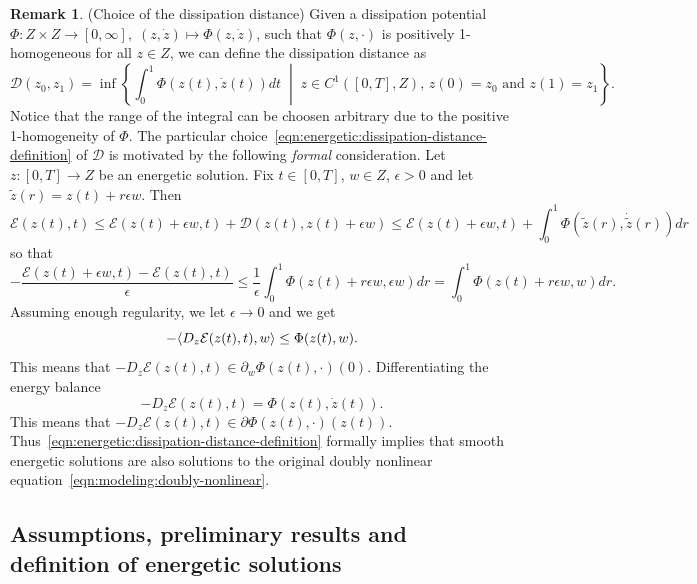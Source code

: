 \documentclass[a4paper,10pt,twoside]{amsbook}
\numberwithin{section}{chapter}
\numberwithin{equation}{chapter}
\theoremstyle{definition}
\newtheorem{rmk}[prop]{Remark}
\DeclarePairedDelimiter{\dual}{\langle}{\rangle}
\begin{document}
\begin{rmk}(Choice of the dissipation distance)
\label{rmk:minimum-dissipation}
Given a dissipation potential $\Phi\colon Z\times Z\to[0,\infty],\;(z,\dot z)\mapsto\Phi(z,\dot z)$, such that $\Phi(z,\cdot)$ is positively 1-homogeneous for all $z\in Z$, we can define the dissipation distance as
\begin{equation}
\label{eqn:energetic:dissipation-distance-definition}
\mathcal{D}(z_0,z_1)=\inf\left\{\int_0^1\Phi(z(t),\dot{z}(t))dt\;\middle|\;\text{$z\in C^1([0,T],Z)$, $z(0)=z_0$ and $z(1)=z_1$}\right\}.
\end{equation}
Notice that the range of the integral can be choosen arbitrary due to the positive 1-homogeneity of $\Phi$. The particular choice~\eqref{eqn:energetic:dissipation-distance-definition} of $\mathcal{D}$ is motivated by the following \emph{formal} consideration. Let $z\colon[0,T]\to Z$ be an energetic solution. Fix $t\in[0,T]$, $w\in Z$, $\epsilon>0$ and let $\tilde z(r)=z(t)+r\epsilon w$. Then
\[
\mathcal{E}(z(t),t)\le\mathcal{E}(z(t)+\epsilon w,t)+\mathcal{D}(z(t),z(t)+\epsilon w)\le\mathcal{E}(z(t)+\epsilon w,t)+\int_0^1\Phi(\tilde z(r),\dot{\tilde z}(r))dr
\]
so that
\[
-\frac{\mathcal{E}(z(t)+\epsilon w,t)-\mathcal{E}(z(t),t)}{\epsilon}\le\frac{1}{\epsilon}\int_0^1\Phi(z(t)+r\epsilon w,\epsilon w)dr=\int_0^1\Phi(z(t)+r\epsilon w,w)dr.
\]
Assuming enough regularity, we let $\epsilon\to 0$ and we get
\[
-\dual{D_z\mathcal{E}(z(t),t),w}\le\Phi(z(t),w).
\]
This means that $-D_z\mathcal{E}(z(t),t)\in\partial_w\Phi(z(t),\cdot)(0)$. Differentiating the energy balance
\[
-D_z\mathcal{E}(z(t),t)=\Phi(z(t),\dot{z}(t)).
\]
This means that $-D_z\mathcal{E}(z(t),t)\in\partial\Phi(z(t),\cdot)(z(t))$. Thus~\eqref{eqn:energetic:dissipation-distance-definition} formally implies that smooth energetic solutions are also solutions to the original doubly nonlinear equation~\ref{eqn:modeling:doubly-nonlinear}.
\end{rmk}

\subsection{Assumptions, preliminary results and definition of energetic solutions}
\label{subsec:assumptions-energetic}
\end{document}
